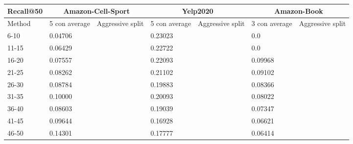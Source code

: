 \begin{table*}[h!]
    \centering
    \begin{tabular}{|l|l|l||l|l||l|l|}
        \hline
        Recall@50 & \multicolumn{2}{c||}{Amazon-Cell-Sport} & \multicolumn{2}{c||}{Yelp2020} & \multicolumn{2}{c|}{Amazon-Book}                                                       \\ \hline
        Method    & 5 con average                           & Aggressive split               & 5 con average                    & Aggressive split & 3 con average & Aggressive split \\ \hline
        6-10      & 0.04706                                 &                                & 0.23023                          &                  & 0.0           &                  \\ \hline
        11-15     & 0.06429                                 &                                & 0.22722                          &                  & 0.0           &                  \\ \hline
        16-20     & 0.07557                                 &                                & 0.22093                          &                  & 0.09968       &                  \\ \hline
        21-25     & 0.08262                                 &                                & 0.21102                          &                  & 0.09102       &                  \\ \hline
        26-30     & 0.08784                                 &                                & 0.19883                          &                  & 0.08366       &                  \\ \hline
        31-35     & 0.10000                                 &                                & 0.20093                          &                  & 0.08022       &                  \\ \hline
        36-40     & 0.08603                                 &                                & 0.19039                          &                  & 0.07347       &                  \\ \hline
        41-45     & 0.09644                                 &                                & 0.16928                          &                  & 0.06621       &                  \\ \hline
        46-50     & 0.14301                                 &                                & 0.17777                          &                  & 0.06414       &                  \\ \hline

\end{tabular}
\end{table*}
